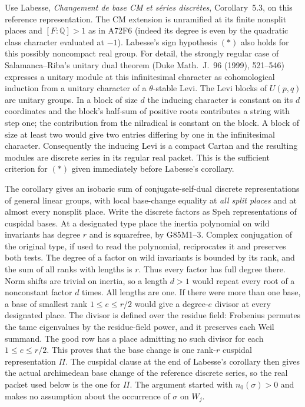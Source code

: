 Use Labesse, \emph{Changement de base CM et s\'eries discr\`etes},
Corollary~5.3, on this reference representation. The CM extension is
unramified at its finite nonsplit places and $[F:\mathbb Q]>1$ as
in A72F6 (indeed its degree is even by the quadratic class
character evaluated at $-1$). Labesse's sign hypothesis $(*)$
also holds for this possibly noncompact real group. For detail,
the strongly regular case of Salamanca--Riba's unitary dual theorem
(Duke Math.\ J.\ 96 (1999), 521--546) expresses a unitary module
at this infinitesimal character as cohomological induction from a
unitary character of a $\theta$-stable Levi. The Levi blocks of
$U(p,q)$ are unitary groups. In a block of size $d$ the inducing
character is constant on its $d$ coordinates and the block's
half-sum of positive roots contributes a string with step one;
the contribution from the nilradical is constant on the block.
A block of size at least two would give two entries differing by
one in the infinitesimal character. Consequently the inducing
Levi is a compact Cartan and the resulting modules are discrete
series in its regular real packet. This is the sufficient criterion
for $(*)$ given immediately before Labesse's corollary.

The corollary gives an isobaric sum of conjugate-self-dual
discrete representations of general linear groups, with local
base-change equality at \emph{all split places} and at almost
every nonsplit place. Write the discrete factors as Speh
representations of cuspidal bases. At a designated type place
the inertia polynomial on wild invariants has degree $r$ and is
squarefree, by G85M1--3. Complex conjugation of the original
type, if used to read the polynomial, reciprocates it and
preserves both tests. The degree of a factor on wild invariants
is bounded by its rank, and the sum of all ranks with lengths
is $r$. Thus every factor has full degree there. Norm shifts
are trivial on inertia, so a length $d>1$ would repeat every
root of a nonconstant factor $d$ times. All lengths are one.
If there were more than one base, a base of smallest rank
$1\le e\le r/2$ would give a degree-$e$ divisor at every designated place.
The divisor is defined over the residue field: Frobenius permutes
the tame eigenvalues by the residue-field power, and it preserves
each Weil summand. The good row has a place admitting no such
divisor for each $1\le e\le r/2$. This proves that the base change is
one rank-$r$ cuspidal representation $\Pi$. The cuspidal clause
at the end of Labesse's corollary then gives the actual
archimedean base change of the reference discrete series, so the
real packet used below is the one for $\Pi$. The argument started
with $n_0(\sigma)>0$ and makes no assumption about the occurrence
of $\sigma$ on $W_j$.

